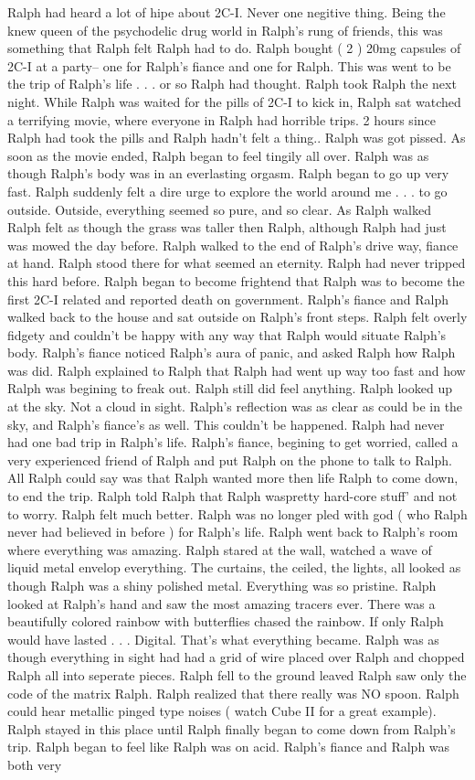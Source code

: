 \documentclass[12pt]{book}
\begin{document}
Ralph had heard a lot of hipe about 2C-I. Never one negitive thing. Being the knew queen of the psychodelic drug world in Ralph's rung of friends, this was something that Ralph felt Ralph had to do. Ralph bought ( 2 ) 20mg capsules of 2C-I at a party-- one for Ralph's fiance and one for Ralph. This was went to be the trip of Ralph's life . . .  or so Ralph had thought. Ralph took Ralph the next night. While Ralph was waited for the pills of 2C-I to kick in, Ralph sat watched a terrifying movie, where everyone in Ralph had horrible trips. 2 hours since Ralph had took the pills and Ralph hadn't felt a thing.. Ralph was got pissed. As soon as the movie ended, Ralph began to feel tingily all over. Ralph was as though Ralph's body was in an everlasting orgasm. Ralph began to go up very fast. Ralph suddenly felt a dire urge to explore the world around me . . .  to go outside. Outside, everything seemed so pure, and so clear. As Ralph walked Ralph felt as though the grass was taller then Ralph, although Ralph had just was mowed the day before. Ralph walked to the end of Ralph's drive way, fiance at hand. Ralph stood there for what seemed an eternity. Ralph had never tripped this hard before. Ralph began to become frightend that Ralph was to become the first 2C-I related and reported death on government. Ralph's fiance and Ralph walked back to the house and sat outside on Ralph's front steps. Ralph felt overly fidgety and couldn't be happy with any way that Ralph would situate Ralph's body. Ralph's fiance noticed Ralph's aura of panic, and asked Ralph how Ralph was did. Ralph explained to Ralph that Ralph had went up way too fast and how Ralph was begining to freak out. Ralph still did feel anything. Ralph looked up at the sky. Not a cloud in sight. Ralph's reflection was as clear as could be in the sky, and Ralph's fiance's as well. This couldn't be happened. Ralph had never had one bad trip in Ralph's life. Ralph's fiance, begining to get worried, called a very experienced friend of Ralph and put Ralph on the phone to talk to Ralph. All Ralph could say was that Ralph wanted more then life Ralph to come down, to end the trip. Ralph told Ralph that Ralph waspretty hard-core stuff' and not to worry. Ralph felt much better. Ralph was no longer pled with god ( who Ralph never had believed in before ) for Ralph's life. Ralph went back to Ralph's room where everything was amazing. Ralph stared at the wall, watched a wave of liquid metal envelop everything. The curtains, the ceiled, the lights, all looked as though Ralph was a shiny polished metal. Everything was so pristine. Ralph looked at Ralph's hand and saw the most amazing tracers ever. There was a beautifully colored rainbow with butterflies chased the rainbow. If only Ralph would have lasted . . .  Digital. That's what everything became. Ralph was as though everything in sight had had a grid of wire placed over Ralph and chopped Ralph all into seperate pieces. Ralph fell to the ground leaved Ralph saw only the code of the matrix Ralph. Ralph realized that there really was NO spoon. Ralph could hear metallic pinged type noises ( watch Cube II for a great example). Ralph stayed in this place until Ralph finally began to come down from Ralph's trip. Ralph began to feel like Ralph was on acid. Ralph's fiance and Ralph was both very 
\end{document}
